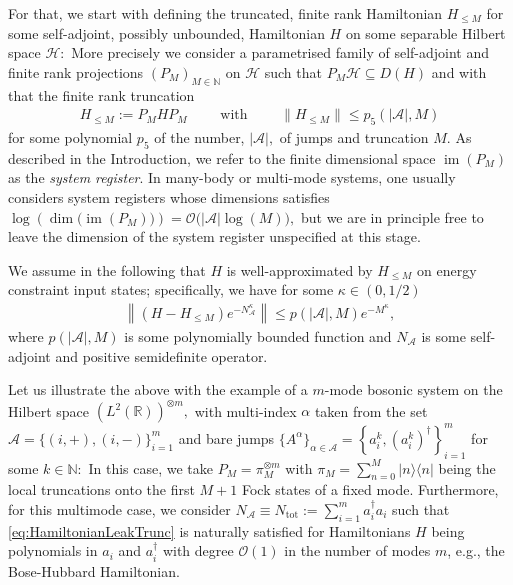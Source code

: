 \documentclass[11pt]{amsart}
\newcommand{\1}{\mathbbm{1}}
\newcommand{\kb}[1]{|#1\rangle\!\langle#1|}
\newcommand{\R}{\mathbb{R}}
\newcommand{\N}{\mathbb{N}}
\newcommand{\cH}{\mathcal{H}}
\newcommand{\NA}{N_{\mathcal{A}}}
\newcommand{\cA}{\mathcal{A}}
\newcommand{\Ntot}{N_{\operatorname{tot}}}
\newcommand{\bin}[1]{}
\theoremstyle{plain}
\theoremstyle{definition}
\theoremstyle{remark}
\numberwithin{equation}{section}
\begin{document}
For that, we start with defining the truncated, finite rank Hamiltonian $H_{\le M}$ for some self-adjoint, possibly unbounded, Hamiltonian $H$ on some separable Hilbert space $\cH:$ More precisely we consider a parametrised family of self-adjoint and finite rank projections  $\left(P_M\right)_{M\in\N}$ on $\cH$ such that $P_M\cH \subseteq D(H)$ and with that the finite rank truncation 
\begin{align}\label{HleMpolybound}
    H_{\le M} := P_MHP_M\qquad \text{ with }\qquad  \|H_{\le M}\|\le p_5(|\mathcal{A}|,M)
\end{align}
for some polynomial $p_5$ of the number, $|\mathcal{A}|,$ of jumps and truncation $M$. As described in the Introduction, we refer to the finite dimensional space $\operatorname{im}(P_M)$ as the \emph{system register}. In many-body or multi-mode systems, one usually considers system registers whose dimensions satisfies
$
\log\left( \dim\bigl(\operatorname{im}(P_M)\bigr)\right)
= \mathcal{O}\bigl(|\mathcal{A}|\log(M)\bigr),
$ but we are in principle free to leave the dimension of the system register unspecified at this stage. 

We assume in the following that $H$ is well-approximated by $H_{\le M}$ on energy constraint input states; specifically, we have for some $\kappa\in(0,1/2)$
\begin{align}
 \label{eq:HamiltonianLeakTrunc}  
 \left\|\left(H-H_{\le M}\right)e^{-\NA^\kappa}\right\| \le p(|\cA|,M) e^{-M^\kappa},
\end{align}
where $p(|\cA|,M)$ is some polynomially bounded function and $\NA$ is some self-adjoint and positive semidefinite operator. \bin{Section~\ref{sec:FiniteTruncBareJumps} around equation \eqref{eq:AbstractFiniteTruncBareJumps}.}

Let us illustrate the above with the example of a $m$-mode bosonic system on the Hilbert space $\left(L^2(\R)\right)^{\otimes m},$ with multi-index $\alpha$ taken from the set $\cA=\{(i,+),(i,-)\}_{i=1}^m$ and bare jumps $\{A^\alpha\}_{\alpha\in \cA}=\left\{a^k_i,(a_i^k)^\dagger\right\}_{i=1}^m$ for some $k\in\N:$
In this case, we take $P_M = \pi^{\otimes m}_M$ with $\pi_M = \sum_{n=0}^M\kb{n}$ being the local truncations onto the first $M+1$ Fock states of a fixed mode. Furthermore, for this multimode case, we consider $\NA\equiv\Ntot:=\sum_{i=1}^m a^\dagger_ia_i$ such that \eqref{eq:HamiltonianLeakTrunc} is naturally satisfied for Hamiltonians $H$ being polynomials in $a_i$ and $a^\dagger_i$ with degree $\mathcal{O}(1)$ in the number of modes $m$, e.g., the Bose-Hubbard Hamiltonian. 
\end{document}
